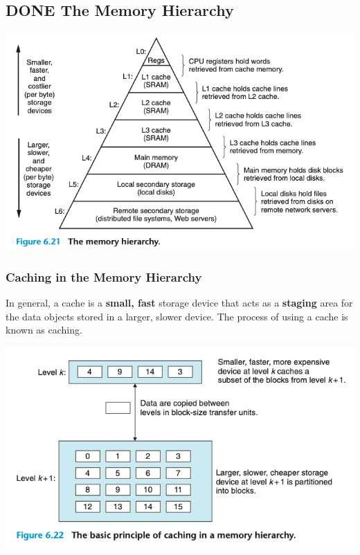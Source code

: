 \documentclass[11pt]{article}
\begin{document}
\subsection{{\bfseries\sffamily DONE} The Memory Hierarchy}
\label{sec:orga97acf7}

\begin{center}
\includegraphics[width=.9\linewidth]{pics/figure6.21-the-memory-hierarchy.png}
\end{center}

\subsubsection{Caching in the Memory Hierarchy}
\label{sec:org5679cab}
In general, a cache is a \textbf{small, fast} storage device that acts as a \textbf{staging} area for the data objects stored in a larger, slower device. The process of using a cache is known as caching.\\

\begin{center}
\includegraphics[width=.9\linewidth]{pics/figure6.22-caching.png}
\end{center}
\end{document}
